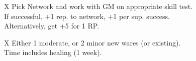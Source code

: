 \bigskip

\begin{eptable}{ X }
   Pick Network and work with GM on appropriate skill test.\\
   If successful, +1 rep. to network, +1 per sup. success.\\
   Alternatively, get +5 for 1 RP.\\
\end{eptable}


\bigskip

\begin{eptable}{ X }
   Either \num{1} moderate, or \num{2} minor new wares (or existing).\\
   Time includes healing (\num{1} week).\\
\end{eptable}
